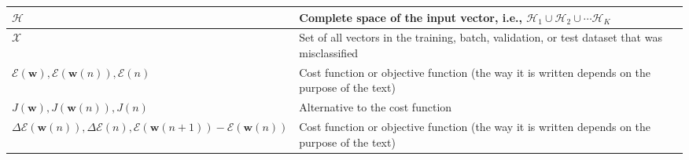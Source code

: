 \documentclass{article}
\begin{document}
\begin{xltabular}{\textwidth}{XX}
	\(\mathscr{H}\)                                                                                                                                                                & Complete space of the input vector, i.e., \(\mathscr{H}_1 \cup \mathscr{H}_2 \cup \cdots \mathscr{H}_K \)                                                                                                                                                                                                                              \\ \hline
	\(\mathscr{X}\) \cite{haykinNeuralNetworksLearning2009}                                                                                                                        & Set of all vectors in the training, batch, validation, or test dataset that was misclassified                                                                                                                                                                                                                                          \\ \hline
	\(\mathscr{E}(\mathbf{w}), \mathscr{E}(\mathbf{w}(n)), \mathscr{E}(n)\)                                                                                                        & Cost function or objective function (the way it is written depends on the purpose of the text)                                                                                                                                                                                                                                         \\ \hline
	\(J(\mathbf{w}), J(\mathbf{w}(n)), J(n)\)                                                                                                                                      & Alternative to the cost function                                                                                                                                                                                                                                                                                                       \\ \hline
	\(\Delta\mathscr{E}(\mathbf{w}(n)), \Delta\mathscr{E}(n), \mathscr{E}(\mathbf{w}(n+1)) - \mathscr{E}(\mathbf{w}(n))\)                                                          & Cost function or objective function (the way it is written depends on the purpose of the text)                                                                                                                                                                                                                                         \\ \hline

\end{xltabular}
\end{document}
